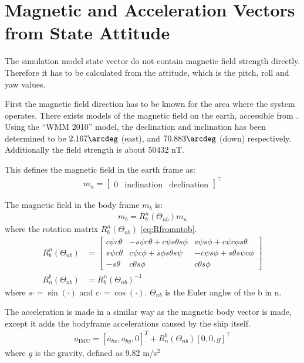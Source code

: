 \section{Magnetic and Acceleration Vectors from State Attitude}
The simulation model state vector do not contain magnetic field
strength directly. Therefore it has to be calculated from the
attitude, which is the pitch, roll and yaw values.

First the magnetic field direction has to be known for the area where the system operates. There exists models of the magnetic field on the earth, accessible from \citep{geomag}. Using the ``WMM 2010'' model, the declination and inclination has been determined to be $2.167 \arcdeg$ (east), and $70.883 \arcdeg$ (down) respectively. Additionally the field strength is about $50432$ nT.

This defines the magnetic field in the earth frame as:
\begin{align}
m_n = \begin{bmatrix}0 & \text{inclination} & \text{declination}\end{bmatrix}^\top
\end{align}

The magnetic field in the body frame $m_b$ is:
\begin{align}
m_b = R_b^n(\Theta_{nb}) m_n 
\end{align}
where the rotation matrix $R_b^n(\Theta_{nb})$ \vref{eq:Rfromntob}.
\begin{align}
R_b^n (\Theta_{nb}) &=
\begin{bmatrix}
c\psi c\theta & -s\psi c\theta + c\psi s\theta s\phi & s\psi s\phi + c\psi c\phi s\theta \\
s\psi c\theta & c\psi c\phi + s\phi s\theta s\psi & -c\psi s\phi + s\theta s\psi c\phi \\
-s\theta & c\theta s\phi & c\theta s\phi
\end{bmatrix}
\label{eq:Rfrombton} \\
R_n^b (\Theta_{nb}) &= R_b^n (\Theta_{nb})^{-1}
\label{eq:Rfromntob}
\end{align}
where $s \cdot = \sin(\cdot)$ and $c \cdot = \cos(\cdot)$. $\Theta_{nb}$ is the Euler angles of the {b} in {n}.

The acceleration is made in a similar way as the magnetic body vector is made, except it adds the bodyframe accelerations caused by the ship itself.
\begin{align}
a_\text{IMU} = [a_{bx}, a_{by}, 0]^T + R_n^b (\Theta_{nb}) [0,0,g]^\top
\label{eq:accl_IMU_construction}
\end{align}
where $g$ is the gravity, defined as 9.82 m/s$^2$

